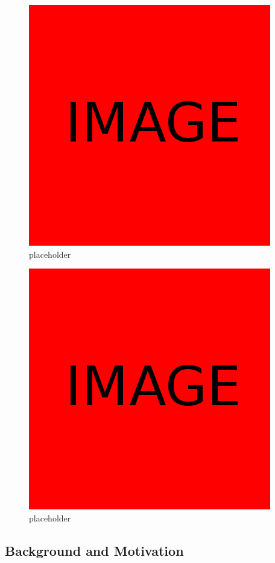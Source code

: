 \documentclass{article}
\begin{document}
\begin{figure}
  \centering
  \includegraphics[scale=0.3]{placeholder}
  \caption{placeholder}
  \label{fig:placeholder1}
\end{figure}
\begin{figure}
  \centering
  \includegraphics[scale=0.3]{placeholder}
  \caption{placeholder}
  \label{fig:placeholder2}
\end{figure}

\subsection{Background and Motivation}
\end{document}
